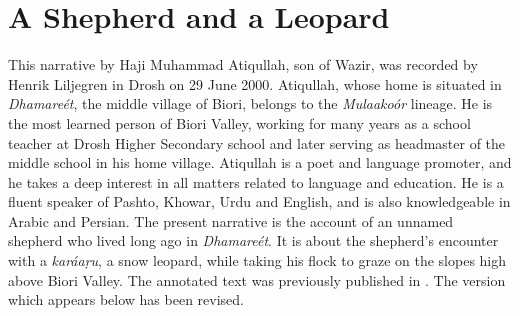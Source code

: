 \appendix
{}

\section*{A Shepherd and a Leopard}

This narrative by Haji Muhammad Atiqullah, son of Wazir, was recorded by Henrik Liljegren in Drosh on 29 June 2000. Atiqullah, whose home is situated in \textit{Dhamareét}, the middle village of Biori, belongs to the \textit{Mulaakoór} lineage. He is the most learned person of Biori Valley, working for many years as a school teacher at Drosh Higher Secondary school and later serving as headmaster of the middle school in his home village. Atiqullah is a poet and language promoter, and he takes a deep interest in all matters related to language and education. He is a fluent speaker of Pashto, Khowar, Urdu and English, and is also knowledgeable in Arabic and Persian. The present narrative is the account of an unnamed shepherd who lived long ago in \textit{Dhamareét}. It is about the shepherd’s encounter with a \textit{karáaṛu}, a snow leopard, while taking his flock to graze on the slopes high above Biori Valley. The annotated text was previously published in \citet[182--187]{liljegrenhaider2015}. The version which appears below has been revised.


